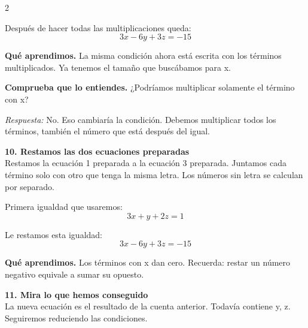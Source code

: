 \documentclass[11pt,a4paper,landscape]{article}
\begin{document}
\begin{multicols*}{2}
\begin{minipage}{\linewidth}
\par\smallskip Después de hacer todas las multiplicaciones queda:
\[3x - 6y + 3z = -15\]
\par\smallskip\textbf{Qué aprendimos.} La misma condición ahora está escrita con los términos multiplicados. Ya tenemos el tamaño que buscábamos para x.
\par\smallskip\textbf{Comprueba que lo entiendes.} ¿Podríamos multiplicar solamente el término con x?\par\textit{Respuesta:} No. Eso cambiaría la condición. Debemos multiplicar todos los términos, también el número que está después del igual.
\end{minipage}\par\medskip
\noindent\begin{minipage}{\linewidth}\textbf{10. Restamos las dos ecuaciones preparadas}\\[2pt]Restamos la ecuación 1 preparada a la ecuación 3 preparada. Juntamos cada término solo con otro que tenga la misma letra. Los números sin letra se calculan por separado.
\par{}\par\smallskip
\par\smallskip Primera igualdad que usaremos:
\[3x + y + 2z = 1\]
\par\smallskip Le restamos esta igualdad:
\[3x - 6y + 3z = -15\]
\par\smallskip\textbf{Qué aprendimos.} Los términos con x dan cero. Recuerda: restar un número negativo equivale a sumar su opuesto.
\end{minipage}\par\medskip
\noindent\begin{minipage}{\linewidth}\textbf{11. Mira lo que hemos conseguido}\\[2pt]La nueva ecuación es el resultado de la cuenta anterior. Todavía contiene y, z. Seguiremos reduciendo las condiciones.

\end{minipage}
\end{multicols*}
\end{document}

